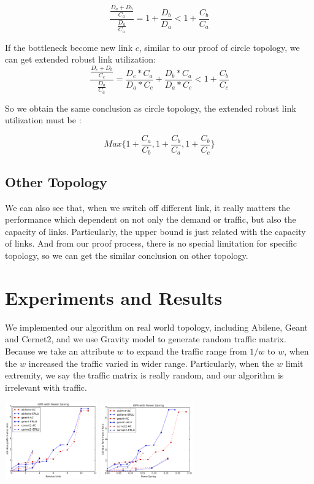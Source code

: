 \documentclass[conference]{IEEEtran}
\begin{document}
\begin{equation}
    \frac{\frac{D_a + D_b}{C_a}}{\frac{D_a}{C_a}} = 1 + \frac{D_b}{D_a} < 1 + \frac{C_b}{C_a}
\end{equation}

If the bottleneck become new link $c$, similar to our proof of circle topology, we can get extended robust link utilization:
\begin{equation}
    \frac{\frac{D_c + D_b}{C_c}}{\frac{D_a}{C_a}} = \frac{D_c * C_a}{D_a * C_c} + \frac{D_b * C_a}{D_a * C_c} < 1 + \frac{C_b}{C_c}
\end{equation}

So we obtain the same conclusion as circle topology, the extended robust link utilization must be :

\begin{equation}
    Max\{1 + \frac{C_a}{C_b}, 1 + \frac{C_b}{C_a}, 1 + \frac{C_b}{C_c}\}
\end{equation}

\subsection{Other Topology}
We can also see that, when we switch off different link, it really matters the performance which dependent on not only the 
demand or traffic, but also the capacity of links. Particularly, the upper bound is just related with the capacity of links.
And from our proof process, there is no special limitation for specific topology, so we can get the similar conclusion 
on other topology.


\section{Experiments and Results}
We implemented our algorithm on real world topology, including Abilene, Geant and Cernet2, and we use Gravity model to generate
random traffic matrix. Because we take an attribute $w$ to expand the traffic range from $1/w$ to $w$, when the $w$ increased the
traffic varied in wider range. Particularly, when the $w$ limit extremity, we say the traffic matrix is really random, and our 
algorithm is irrelevant with traffic.

\vspace*{0.2in}
\includegraphics[width=4cm]{opr_with_remove_links}
\includegraphics[width=4cm]{opr_with_power_saving}
\vspace*{0.2in}
\end{document}
